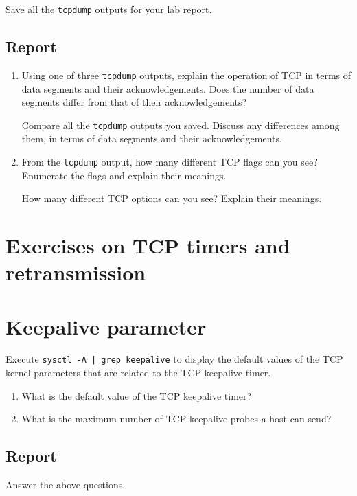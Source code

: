 \documentclass{../UTNetLab}
\begin{document}
    {Save} all the \lstinline{tcpdump} outputs for your lab report.
    
    \subsection*{Report}
    \begin{enumerate}
        \item Using one of three \lstinline{tcpdump} outputs, explain the operation of TCP in terms of data segments and their acknowledgements. Does the number of data segments differ from that of their acknowledgements?

        Compare all the \lstinline{tcpdump} outputs you saved.
        Discuss any differences among them, in terms of data segments and their acknowledgements.
        
        \item From the \lstinline{tcpdump} output, how many different TCP flags can you see? Enumerate the flags and explain their meanings.

        How many different TCP options can you see?
        Explain their meanings.
    \end{enumerate}

\section*{Exercises on TCP timers and retransmission}
\section{Keepalive parameter}
    Execute \lstinline{sysctl -A | grep keepalive} to display the default values of the TCP kernel parameters that are related to the TCP keepalive timer.

    \begin{enumerate}
        \item What is the default value of the TCP keepalive timer?
        \item What is the maximum number of TCP keepalive probes a host can send?
    \end{enumerate}
    
    \subsection*{Report}
    Answer the above questions.
\end{document}
